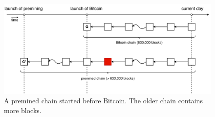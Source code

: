 \begin{figure}[hbt] \centering

    \includegraphics[width=12cm]{./images/premining_attack_nipopow.pdf}

    \caption{ A premined chain started before Bitcoin. The older chain contains
    more blocks.}

    \label{figure:premining_attack_nipopow} \end{figure}
